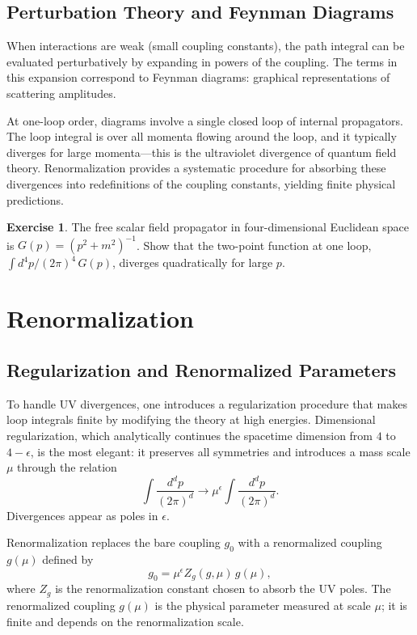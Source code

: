 \documentclass[12pt,a4paper,oneside]{book}
\theoremstyle{definition}
\newtheorem{exercise}{Exercise}[chapter]
\theoremstyle{plain}
\theoremstyle{remark}
\begin{document}
\section{Perturbation Theory and Feynman Diagrams}

When interactions are weak (small coupling constants), the path integral can
be evaluated perturbatively by expanding in powers of the coupling. The
terms in this expansion correspond to Feynman diagrams: graphical
representations of scattering amplitudes.

At one-loop order, diagrams involve a single closed loop of internal
propagators. The loop integral is over all momenta flowing around the loop,
and it typically diverges for large momenta---this is the ultraviolet
divergence of quantum field theory. Renormalization provides a systematic
procedure for absorbing these divergences into redefinitions of the coupling
constants, yielding finite physical predictions.

\begin{exercise}
The free scalar field propagator in four-dimensional Euclidean space is
$G(p) = (p^2 + m^2)^{-1}$. Show that the two-point function at one loop,
$\int d^4p/(2\pi)^4\,G(p)$, diverges quadratically for large $p$.
\end{exercise}

\chapter{Renormalization}

\section{Regularization and Renormalized Parameters}

To handle UV divergences, one introduces a regularization procedure that makes
loop integrals finite by modifying the theory at high energies. Dimensional
regularization, which analytically continues the spacetime dimension from $4$
to $4-\epsilon$, is the most elegant: it preserves all symmetries and
introduces a mass scale $\mu$ through the relation
\begin{equation}
\int \frac{d^dp}{(2\pi)^d}\to \mu^\epsilon\int\frac{d^dp}{(2\pi)^d}.
\end{equation}
Divergences appear as poles in $\epsilon$.

Renormalization replaces the bare coupling $g_0$ with a renormalized coupling
$g(\mu)$ defined by
\begin{equation}
g_0 = \mu^\epsilon Z_g(g,\mu)\,g(\mu),
\end{equation}
where $Z_g$ is the renormalization constant chosen to absorb the UV poles.
The renormalized coupling $g(\mu)$ is the physical parameter measured at scale
$\mu$; it is finite and depends on the renormalization scale.
\end{document}

